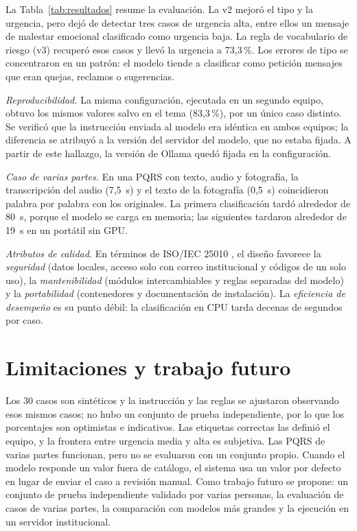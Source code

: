 \documentclass[conference]{IEEEtran}
\begin{document}
La Tabla~\ref{tab:resultados} resume la evaluación. La v2 mejoró el tipo y la urgencia, pero dejó de detectar tres casos de urgencia alta, entre ellos un mensaje de malestar emocional clasificado como urgencia baja. La regla de vocabulario de riesgo (v3) recuperó esos casos y llevó la urgencia a 73,3\,\%. Los errores de tipo se concentraron en un patrón: el modelo tiende a clasificar como petición mensajes que eran quejas, reclamos o sugerencias.

\textit{Reproducibilidad.} La misma configuración, ejecutada en un segundo equipo, obtuvo los mismos valores salvo en el tema (83,3\,\%), por un único caso distinto. Se verificó que la instrucción enviada al modelo era idéntica en ambos equipos; la diferencia se atribuyó a la versión del servidor del modelo, que no estaba fijada. A partir de este hallazgo, la versión de Ollama quedó fijada en la configuración.

\textit{Caso de varias partes.} En una PQRS con texto, audio y fotografía, la transcripción del audio (7,5~s) y el texto de la fotografía (0,5~s) coincidieron palabra por palabra con los originales. La primera clasificación tardó alrededor de 80~s, porque el modelo se carga en memoria; las siguientes tardaron alrededor de 19~s en un portátil sin GPU.

\textit{Atributos de calidad.} En términos de ISO/IEC 25010 \cite{iso25010}, el diseño favorece la \emph{seguridad} (datos locales, acceso solo con correo institucional y códigos de un solo uso), la \emph{mantenibilidad} (módulos intercambiables y reglas separadas del modelo) y la \emph{portabilidad} (contenedores y documentación de instalación). La \emph{eficiencia de desempeño} es su punto débil: la clasificación en CPU tarda decenas de segundos por caso.

\section{Limitaciones y trabajo futuro}
Los 30 casos son sintéticos y la instrucción y las reglas se ajustaron observando esos mismos casos; no hubo un conjunto de prueba independiente, por lo que los porcentajes son optimistas e indicativos. Las etiquetas correctas las definió el equipo, y la frontera entre urgencia media y alta es subjetiva. Las PQRS de varias partes funcionan, pero no se evaluaron con un conjunto propio. Cuando el modelo responde un valor fuera de catálogo, el sistema usa un valor por defecto en lugar de enviar el caso a revisión manual. Como trabajo futuro se propone: un conjunto de prueba independiente validado por varias personas, la evaluación de casos de varias partes, la comparación con modelos más grandes y la ejecución en un servidor institucional.
\end{document}
